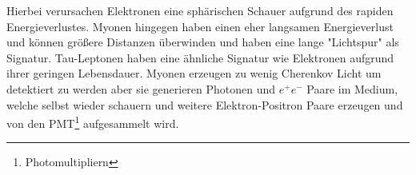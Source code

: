 Hierbei verursachen Elektronen eine sph\"arischen Schauer aufgrund des rapiden Energieverlustes. Myonen hingegen haben einen eher langsamen Energieverlust und k\"onnen gr\"o\ss ere Distanzen \"uberwinden und haben eine lange "Lichtspur" als Signatur. Tau-Leptonen haben eine \"ahnliche Signatur wie Elektronen aufgrund ihrer geringen Lebensdauer.
Myonen erzeugen zu wenig Cherenkov Licht um detektiert zu werden aber sie generieren Photonen und $e^+ e^-$ Paare im Medium, welche selbst wieder schauern und weitere Elektron-Positron Paare erzeugen und von den PMT\footnote{Photomultipliern} aufgesammelt wird.
